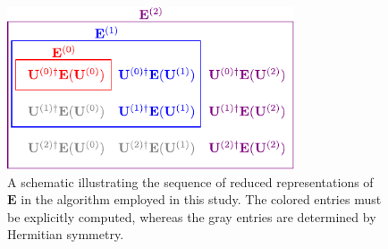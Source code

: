 \begin{figure}[h!]
    \centering
    \caption{%
        \label{fig:davidson}
        A schematic illustrating the sequence of reduced representations of
        \(\mathbf{E}\) in the algorithm employed in this study.
        The colored entries must be explicitly computed, whereas the gray
        entries are determined by Hermitian symmetry.
    }
    \includegraphics[width=8.5cm]{figures/davidson.pdf}
\end{figure}

